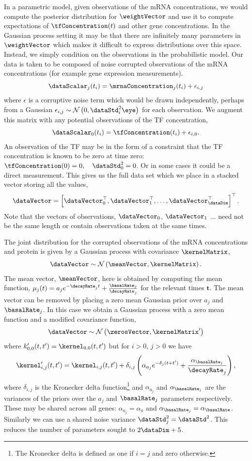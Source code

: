 \documentclass{article}
\begin{document}
In a parametric model, given observations of the mRNA concentrations, we would compute the posterior distribution for $\weightVector$ and use it to compute expectations of $\tfConcentration(t)$ and other gene concentrations. In the Gaussian process setting it may be that there are infinitely many parameters in $\weightVector$ which makes it difficult to express distributions over this space. Instead, we simply condition on the observations in the probabilistic model. Our data is taken to be composed of noise corrupted observations of the mRNA concentrations (for example gene expression measurements). 
\[
\dataScalar_j(t_i) =\mrnaConcentration_j(t_i) +\epsilon_{i,j}
\]
where $\epsilon$ is a corruptive noise term which would be drawn independently, perhaps from a Gaussian $\epsilon_{i,j} \sim \mathcal{N}\left(0, \dataStd^2_i\eye\right)$ for each observation. We augment this matrix with any potential observations of the TF concentration,
\[
\dataScalar_0(t_i) =\tfConcentration(t_i) +\epsilon_{i,0}.
\]
An observation of the TF may be in the form of a constraint that the TF concentration is known to be zero at time zero: $\tfConcentration(0)=0, \quad \dataStd^2_0=0$.  Or in some cases it could be a direct measurement. This gives us the full data set which we place in a stacked vector storing all the values,
\[
\dataVector = \left[\dataVector_0^\top, \dataVector_1^\top, \dots, \dataVector_\dataDim^\top\right]^\top.
\]
Note that the vectors of observations, $\dataVector_0$, $\dataVector_1$ ... need not be the same length or contain observations taken at the same times. 

The joint distribution for the corrupted observations of the mRNA concentrations and protein is given by a Gaussian process with covariance $\kernelMatrix$, 
\[
\dataVector \sim \mathcal{N}\left(\meanVector, \kernelMatrix\right).
\]
The mean vector, $\meanVector$, here is obtained by computing the mean function, $\mu_j(t)=a_je^{-\decayRate_jt} +\frac{\basalRate_j}{\decayRate_j}$ for the relevant times $\mathbf{t}$. The mean vector can be removed by placing a zero mean Gaussian prior over $a_j$ and $\basalRate_j$. In this case we obtain a Gaussian process with a zero mean function and a modified covariance function,
\[
\dataVector \sim \mathcal{N}\left(\zerosVector, \kernelMatrix^\prime\right)
\]
where $k^\prime_{0,0}(t, t^\prime) = \kernel_{0,0}(t, t^\prime)$ but for $i>0$, $j>0$ we have
\[
\kernel^\prime_{i,j}(t, t^\prime) = \kernel_{i,j}(t, t^\prime)
+ \delta_{i,j}\left(\alpha_{a_j} e^{-\delta_j (t+t^\prime)} +
\frac{\alpha_{\basalRate_j}}{\decayRate_j}\right),
\] 
where
$\delta_{i,j}$ is the Kronecker delta function\footnote{The Kronecker delta is defined as one if $i=j$ and zero otherwise.} and $\alpha_{a_j}$ and $\alpha_{\basalRate_j}$ are the variances of the priors over the $a_j$ and $\basalRate_j$ parameters respectively. These may be shared across all genes: $\alpha_{a_j}=\alpha_a$ and $\alpha_{\basalRate_j}=\alpha_\basalRate$. Similarly we can use a shared noise variance $\dataStd^2_j=\dataStd^2$. This reduces the number of parameters sought to $2\dataDim + 5$.  
\end{document}
